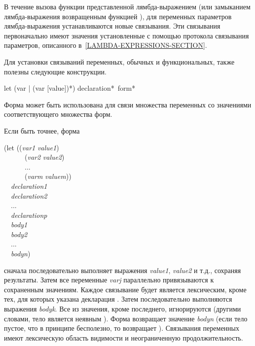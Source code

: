 В течение вызова функции представленной лямбда-выражением (или замыканием
лямбда-выражения возвращенным функцией ),
для переменных параметров лямбда-выражения устанавливаются новые связывания. Эти
связывания первоначально имеют значения установленные с помощью протокола
связывания параметров, описанного в~\ref{LAMBDA-EXPRESSIONS-SECTION}.

Для установки связываний переменных, обычных и функциональных, также полезны
следующие конструкции.

\begin{defspec}
let ({var | (var [value])}*) {declaration}* {\,form}*

Форма  может быть использована для связи множества переменных со
значениями соответствующего множества форм.

Если быть точнее, форма
\begin{lisp}
(let ((\emph{var1} \emph{value1}) \\
~~~~~~(\emph{var2} \emph{value2}) \\
~~~~~~... \\
~~~~~~(\emph{varm} \emph{valuem})) \\
~~\emph{declaration1} \\
~~\emph{declaration2} \\
~~... \\
~~\emph{declarationp} \\
~~\emph{body1} \\
~~\emph{body2} \\
~~... \\
~~\emph{bodyn})
\end{lisp}
сначала последовательно выполняет выражения \emph{value1}, \emph{value2} и т.д.,
сохраняя результаты.
Затем все переменные \emph{varj} параллельно привязываются к сохраненным
значениям. Каждое связывание будет является лексическим, кроме тех, для которых
указана декларация .
Затем последовательно выполняются выражения \emph{bodyk}. Все из значения, кроме
последнего, игнорируются (другими словами, тело  является неявным
).
Форма  возвращает значение \emph{bodyn} (если тело пустое, что в
принципе бесполезно, то  возвращает {\false}).
Связывания переменных имеют лексическую область видимости и неограниченную
продолжительность.


\end{defspec}
